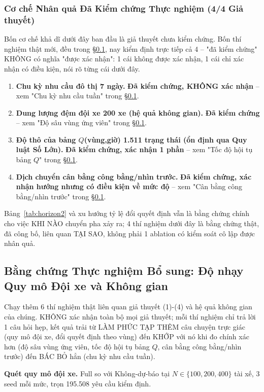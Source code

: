 \documentclass[10pt,twocolumn,a4paper]{article}
\begin{document}
\subsubsection{Cơ chế Nhân quả Đã Kiểm chứng Thực nghiệm (4/4 Giả thuyết)}
Bốn cơ chế khả dĩ dưới đây ban đầu là giả thuyết chưa kiểm chứng. Bốn thí
nghiệm thật mới, đều trong \S\ref{sec:additional}, nay kiểm định trực tiếp
cả 4 -- "đã kiểm chứng" KHÔNG có nghĩa "được xác nhận": 1 cái không được
xác nhận, 1 cái chỉ xác nhận có điều kiện, nói rõ từng cái dưới đây.
\begin{enumerate}
\item \textbf{Chu kỳ nhu cầu đô thị 7 ngày.} \textbf{Đã kiểm chứng, KHÔNG
xác nhận} -- xem "Chu kỳ nhu cầu tuần" trong \S\ref{sec:additional}.
\item \textbf{Dung lượng đệm đội xe 200 xe (hệ quả không gian).}
\textbf{Đã kiểm chứng} -- xem "Độ sâu vùng ứng viên" trong \S\ref{sec:additional}.
\item \textbf{Độ thô của bảng $Q$(vùng,giờ) 1.511 trạng thái (ổn định qua
Quy luật Số Lớn).} \textbf{Đã kiểm chứng, xác nhận 1 phần} -- xem "Tốc độ
hội tụ bảng $Q$" trong \S\ref{sec:additional}.
\item \textbf{Dịch chuyển cân bằng công bằng/nhìn trước.} \textbf{Đã kiểm
chứng, xác nhận hướng nhưng có điều kiện về mức độ} -- xem "Cân bằng
công bằng/nhìn trước" trong \S\ref{sec:additional}.
\end{enumerate}
Bảng~\ref{tab:horizon2} và xu hướng tỷ lệ đổi quyết định vẫn là bằng chứng
chính cho việc KHI NÀO chuyển pha xảy ra; 4 thí nghiệm dưới đây là bằng
chứng thật, đã công bố, liên quan TẠI SAO, không phải 1 ablation có kiểm
soát cô lập được nhân quả.

\subsection{Bằng chứng Thực nghiệm Bổ sung: Độ nhạy Quy mô Đội xe và Không gian}
\label{sec:additional}
Chạy thêm 6 thí nghiệm thật liên quan giả thuyết (1)-(4) và hệ quả không
gian của chúng. KHÔNG xác nhận toàn bộ mọi giả thuyết; mỗi thí nghiệm chỉ
trả lời 1 câu hỏi hẹp, kết quả trải từ LÀM PHỨC TẠP THÊM câu chuyện trực
giác (quy mô đội xe, đổi quyết định theo vùng) đến KHỚP với nó khi đo
chính xác hơn (độ sâu vùng ứng viên, tốc độ hội tụ bảng $Q$, cân bằng công
bằng/nhìn trước) đến BÁC BỎ hẳn (chu kỳ nhu cầu tuần).

\textbf{Quét quy mô đội xe.} Full so với Không-dự-báo tại $N\in\{100,200,400\}$
tài xế, 3 seed mỗi mức, trọn 195.508 yêu cầu kiểm định.
\end{document}
